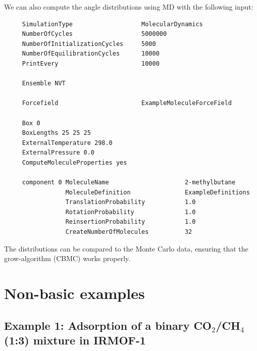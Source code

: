 We can also compute the angle distributions using MD with the following input:
\begin{tiny}
\begin{verbatim}
     SimulationType                   MolecularDynamics
     NumberOfCycles                   5000000
     NumberOfInitializationCycles     5000
     NumberOfEquilibrationCycles      10000
     PrintEvery                       10000

     Ensemble NVT

     Forcefield                       ExampleMoleculeForceField

     Box 0
     BoxLengths 25 25 25
     ExternalTemperature 298.0
     ExternalPressure 0.0
     ComputeMoleculeProperties yes

     component 0 MoleculeName                     2-methylbutane
                 MoleculeDefinition               ExampleDefinitions
                 TranslationProbability           1.0
                 RotationProbability              1.0
                 ReinsertionProbability           1.0
                 CreateNumberOfMolecules          32
\end{verbatim}
\end{tiny}
The distributions can be compared to the Monte Carlo data, ensuring that the grow-algorithm (CBMC) works properly.

\section{Non-basic examples}
\subsection*{Example 1: Adsorption of a binary CO$_2$/CH$_4$ (1:3) mixture in IRMOF-1}

